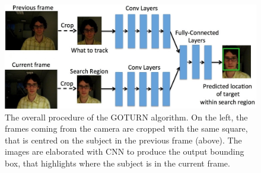 \begin{figure}[!h]
	\centering
	\includegraphics[width=0.9\linewidth]{images/tracking/howItWorks_GOTURN}
	\captionsetup{margin=0.5cm}
	\caption[The overall procedure of the GOTURN algorithm.]{The overall procedure of the GOTURN algorithm. On the left, the frames coming from the camera are cropped with the same square, that is centred on the subject in the previous frame (above). The images are elaborated with CNN to produce the output bounding box, that highlights where the subject is in the current frame.}
	\label{fig:howItWorks_GOTURN}
\end{figure}
